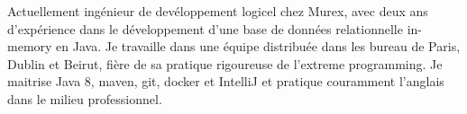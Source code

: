 
\begin{cvparagraph}

Actuellement ingénieur de devéloppement logicel chez Murex, avec deux ans d'expérience dans le développement d'une base de données relationnelle in-memory en Java. Je travaille dans une équipe distribuée dans les bureau de Paris, Dublin et Beirut, fière de sa pratique rigoureuse de l'extreme programming. Je maitrise Java 8, maven, git, docker et IntelliJ et pratique couramment l'anglais dans le milieu professionnel.

\end{cvparagraph}
